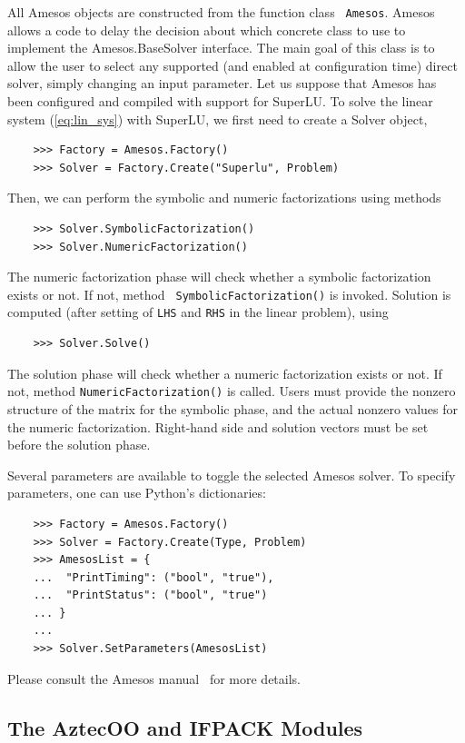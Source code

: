 \documentclass[10pt,relax]{SANDreport}
\begin{document}
All Amesos objects are constructed from the function class {\tt
  Amesos}.  Amesos allows a code to delay the decision about which
concrete class to use to implement the Amesos.BaseSolver
interface. The main goal of this class is to allow the user to select
any supported (and enabled at configuration time) direct solver,
simply changing an input parameter. Let us suppose that Amesos has
been configured and compiled with support for SuperLU. To solve the
linear system (\ref{eq:lin_sys}) with SuperLU, we first need to create
a Solver object,
\begin{verbatim}
    >>> Factory = Amesos.Factory()
    >>> Solver = Factory.Create("Superlu", Problem)
\end{verbatim}
Then, we can perform the symbolic and numeric factorizations using methods
\begin{verbatim}
    >>> Solver.SymbolicFactorization()
    >>> Solver.NumericFactorization()
\end{verbatim}
The numeric factorization phase will check whether a symbolic
factorization exists or not. If not, method {\tt
  SymbolicFactorization()} is invoked.  Solution is computed (after
setting of {\tt LHS} and {\tt RHS} in the linear problem), using
\begin{verbatim}
    >>> Solver.Solve()
\end{verbatim}
The solution phase will check whether a numeric factorization exists
or not. If not, method {\tt NumericFactorization()} is called.  Users
must provide the nonzero structure of the matrix for the symbolic
phase, and the actual nonzero values for the numeric
factorization. Right-hand side and solution vectors must be set before
the solution phase.
  
Several parameters are available to toggle the selected Amesos solver.
To specify parameters, one can use Python's dictionaries:
\begin{verbatim}
    >>> Factory = Amesos.Factory()
    >>> Solver = Factory.Create(Type, Problem)
    >>> AmesosList = {
    ...  "PrintTiming": ("bool", "true"),
    ...  "PrintStatus": ("bool", "true")
    ... }
    ...
    >>> Solver.SetParameters(AmesosList)
\end{verbatim}
Please consult the Amesos manual~\cite{Amesos-Reference-Guide} for
more details.

\subsection{The AztecOO and IFPACK Modules}
\label{subsec:aztecoo_ifpack}
\end{document}
